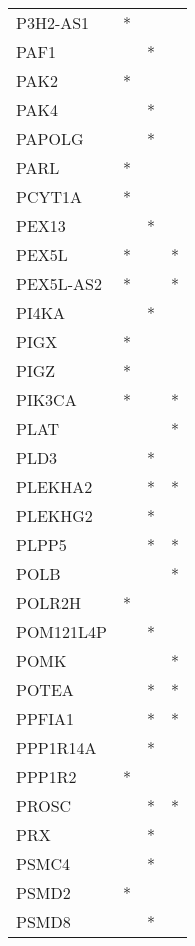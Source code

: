 \begin{longtable}{lccc}
P3H2-AS1         &     * &    &         \\
PAF1             &       &  * &         \\
PAK2             &     * &    &         \\
PAK4             &       &  * &         \\
PAPOLG           &       &  * &         \\
PARL             &     * &    &         \\
PCYT1A           &     * &    &         \\
PEX13            &       &  * &         \\
PEX5L            &     * &    &       * \\
PEX5L-AS2        &     * &    &       * \\
PI4KA            &       &  * &         \\
PIGX             &     * &    &         \\
PIGZ             &     * &    &         \\
PIK3CA           &     * &    &       * \\
PLAT             &       &    &       * \\
PLD3             &       &  * &         \\
PLEKHA2          &       &  * &       * \\
PLEKHG2          &       &  * &         \\
PLPP5            &       &  * &       * \\
POLB             &       &    &       * \\
POLR2H           &     * &    &         \\
POM121L4P        &       &  * &         \\
POMK             &       &    &       * \\
POTEA            &       &  * &       * \\
PPFIA1           &       &  * &       * \\
PPP1R14A         &       &  * &         \\
PPP1R2           &     * &    &         \\
PROSC            &       &  * &       * \\
PRX              &       &  * &         \\
PSMC4            &       &  * &         \\
PSMD2            &     * &    &         \\
PSMD8            &       &  * &         \\

\end{longtable}
